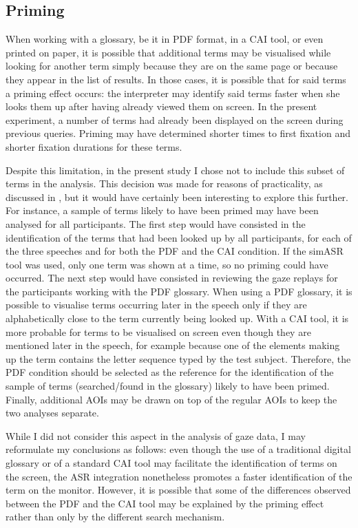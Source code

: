 \subsection{Priming} \label{priming}
When working with a glossary, be it in PDF format, in a CAI tool, or even printed on paper, it is possible that additional terms may be visualised while looking for another term simply because they are on the same page or because they appear in the list of results. In those cases, it is possible that for said terms a priming effect occurs: the interpreter may identify said terms faster when she looks them up after having already viewed them on screen. In the present experiment, a number of terms had already been displayed on the screen during previous queries. Priming may have determined shorter times to first fixation and shorter fixation durations for these terms.

Despite this limitation, in the present study I chose not to include this subset of terms in the analysis. This decision was made for reasons of practicality, as discussed in , but it would have certainly been interesting to explore this further. For instance, a sample of terms likely to have been primed may have been analysed for all participants. The first step would have consisted in the identification of the terms that had been looked up by all participants, for each of the three speeches and for both the PDF and the CAI condition. If the simASR tool was used, only one term was shown at a time, so no priming could have occurred. The next step would have consisted in reviewing the gaze replays for the participants working with the PDF glossary. When using a PDF glossary, it is possible to visualise terms occurring later in the speech only if they are alphabetically close to the term currently being looked up. With a CAI tool, it is more probable for terms to be visualised on screen even though they are mentioned later in the speech, for example because one of the elements making up the term contains the letter sequence typed by the test subject. Therefore, the PDF condition should be selected as the reference for the identification of the sample of terms (searched/found in the glossary) likely to have been primed. Finally, additional AOIs may be drawn on top of the regular AOIs to keep the two analyses separate.

While I did not consider this aspect in the analysis of gaze data, I may reformulate my conclusions as follows: even though the use of a traditional digital glossary or of a standard CAI tool may facilitate the identification of terms on the screen, the ASR integration nonetheless promotes a faster identification of the term on the monitor. However, it is possible that some of the differences observed between the PDF and the CAI tool may be explained by the priming effect rather than only by the different search mechanism.
